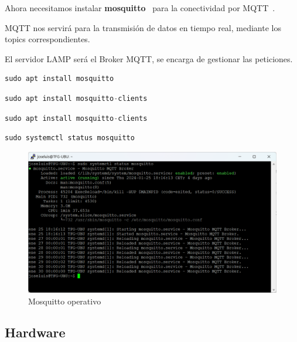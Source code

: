 Ahora necesitamos instalar \textbf{mosquitto}~\cite{misc:mosquitto} para la conectividad por MQTT~\cite{manual:MQTT}.

MQTT nos servirá para la transmisión de datos en tiempo real, mediante los topics correspondientes.

El servidor LAMP será el Broker MQTT, se encarga de gestionar las peticiones.

\begin{lstlisting}[language=cpp, firstnumber=0, basicstyle=\normalsize, caption={Comando para instalar mosquitto.}] 
sudo apt install mosquitto\end{lstlisting}

\begin{lstlisting}[language=cpp, firstnumber=0, basicstyle=\normalsize, caption={Comando para instalar mosquitto-clients.}] 
sudo apt install mosquitto-clients\end{lstlisting}

\begin{lstlisting}[language=cpp, firstnumber=0, basicstyle=\normalsize, caption={Comando para instalar mosquitto-clients.}] 
sudo apt install mosquitto-clients\end{lstlisting}

\begin{lstlisting}[language=cpp, firstnumber=0, basicstyle=\normalsize, caption={Comando para comprobar el estado de mosquitto.}] 
sudo systemctl status mosquitto\end{lstlisting}

\begin{figure}[h]
\centering
\includegraphics[width=1\textwidth]{img/desarrollo/mosquitto_estado.png}
\caption{Mosquitto operativo}
\end{figure}

\subsection{Hardware}


